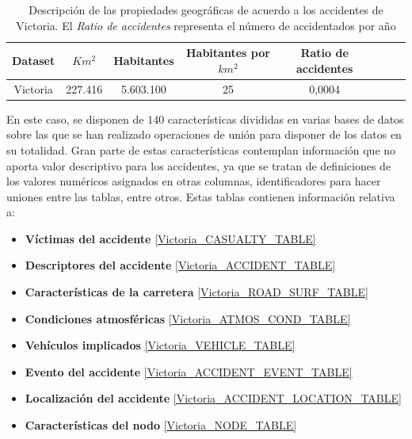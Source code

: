 \begin{table}[H]
	\caption[Descripción de las propiedades geográficas de acuerdo a los accidentes de Victoria]{Descripción de las propiedades geográficas de acuerdo a los accidentes de Victoria. El \textit{Ratio de accidentes} representa el número de accidentados por año}
	\begin{center}
		\begin{tabular}{|c|c||c|c|c|c|c|c|}
			\hline
			\textbf{Dataset} & \textbf{$Km^2$} & \textbf{Habitantes} & \textbf{Habitantes por $km^2$} & \textbf{Ratio de accidentes}
			\\ \hline \hline
			Victoria & 227.416 &  5.603.100  & 25  & 0,0004\\ \hline
		\end{tabular}
	\end{center}

	\label{Victoria_statistics}
\end{table}


En este caso, se disponen de $140$ características divididas en varias bases de datos sobre las que se han realizado operaciones de unión para disponer de los datos en su totalidad. Gran parte de estas características contemplan información que no aporta valor descriptivo para los accidentes, ya que se tratan de definiciones de los valores numéricos asignados en otras columnas, identificadores para hacer uniones entre las tablas, entre otros. Estas tablas contienen información relativa a:

\begin{itemize}
	\item \textbf{Víctimas del accidente} \ref{Victoria_CASUALTY_TABLE}
	\item \textbf{Descriptores del accidente} \ref{Victoria_ACCIDENT_TABLE}
	\item \textbf{Características de la carretera} \ref{Victoria_ROAD_SURF_TABLE}
	\item \textbf{Condiciones atmosféricas} \ref{Victoria_ATMOS_COND_TABLE}
	\item \textbf{Vehículos implicados} \ref{Victoria_VEHICLE_TABLE}
	\item \textbf{Evento del accidente} \ref{Victoria_ACCIDENT_EVENT_TABLE}
	\item \textbf{Localización del accidente} \ref{Victoria_ACCIDENT_LOCATION_TABLE}
	\item \textbf{Características del nodo} \ref{Victoria_NODE_TABLE}
\end{itemize}

